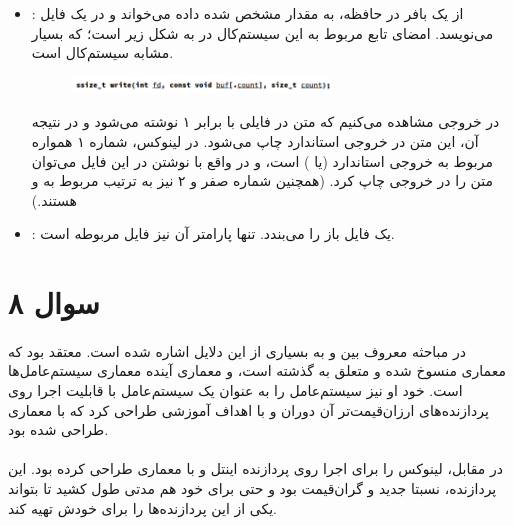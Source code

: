 \documentclass{article}
\begin{document}
\begin{itemize}
		\item{
			:
		}
		از یک بافر در حافظه، به مقدار مشخص شده داده می‌خواند و در یک فایل می‌نویسد. امضای تابع مربوط به این سیستم‌کال در
		به شکل زیر است؛ که بسیار مشابه سیستم‌کال
		است.

		\begin{figure}[H]
			\centering
			\includegraphics[width=0.65\textwidth]{write_sig}
		\end{figure}

		در خروجی
		مشاهده می‌کنیم که متن
		در فایلی با
		برابر ۱ نوشته می‌شود و در نتیجه آن، این متن در خروجی استاندارد چاپ می‌شود. در لینوکس،
		شماره ۱ همواره مربوط به خروجی استاندارد (یا
		)
		است، و در واقع با نوشتن در این فایل می‌توان متن را در خروجی چاپ کرد.
		(همچنین
		شماره صفر و ۲ نیز به ترتیب مربوط به
		و
		هستند.)

		\item{
			:
		}
		یک فایل باز را می‌بندد. تنها پارامتر آن نیز
		فایل مربوطه است.
	\end{itemize}

	\section*{سوال ۸}
	\paragraph*{}

	در مباحثه معروف بین
	و
	به بسیاری از این دلایل اشاره شده است.
	معتقد بود که معماری
	منسوخ شده و متعلق به گذشته است، و معماری
	آینده معماری سیستم‌عامل‌ها است. خود او نیز سیستم‌عامل
	را به عنوان یک سیستم‌عامل با قابلیت اجرا روی پردازنده‌های ارزان‌قیمت‌تر آن دوران و با اهداف آموزشی طراحی کرد که با معماری
	طراحی شده بود.
	\paragraph*{}
	در مقابل،
	لینوکس را برای اجرا روی پردازنده
	اینتل و با معماری
	طراحی کرده بود. این پردازنده، نسبتا جدید و گران‌قیمت بود و حتی برای خود
	هم مدتی طول کشید تا بتواند یکی از این پردازنده‌ها را برای خودش تهیه کند.
\end{document}
